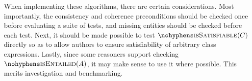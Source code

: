 \documentclass[paper.tex]{subfiles}
\begin{document}
When implementing these algorithms, there are certain considerations.
Most importantly, the consistency and coherence preconditions should be checked once before evaluating a suite of tests, and missing entities should be checked before each test.
Next, it should be made possible to test $\textproc{isSatisfiable}(C)$ directly so as to allow authors to ensure satisfiability of arbitrary class expressions.
Lastly, since some reasoners support checking $\textproc{isEntailed}(A)$, it may make sense to use it where possible.  This merits investigation and benchmarking.
\end{document}
